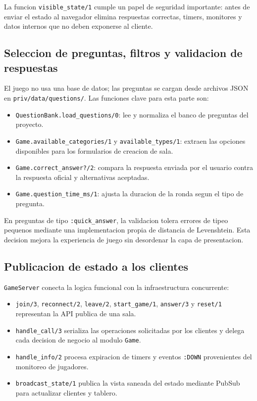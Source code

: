 \documentclass[12pt,a4paper]{article}
\begin{document}
La funcion \texttt{visible\_state/1} cumple un papel de seguridad importante:
antes de enviar el estado al navegador elimina respuestas correctas, timers,
monitores y datos internos que no deben exponerse al cliente.

\subsection{Seleccion de preguntas, filtros y validacion de respuestas}

El juego no usa una base de datos; las preguntas se cargan desde archivos JSON
en \texttt{priv/data/questions/}. Las funciones clave para esta parte son:

\begin{itemize}
  \item \texttt{QuestionBank.load\_questions/0}: lee y normaliza el banco de
  preguntas del proyecto.
  \item \texttt{Game.available\_categories/1} y \texttt{available\_types/1}:
  extraen las opciones disponibles para los formularios de creacion de sala.
  \item \texttt{Game.correct\_answer?/2}: compara la respuesta enviada por el
  usuario contra la respuesta oficial y alternativas aceptadas.
  \item \texttt{Game.question\_time\_ms/1}: ajusta la duracion de la ronda segun
  el tipo de pregunta.
\end{itemize}

En preguntas de tipo \texttt{:quick\_answer}, la validacion tolera errores de
tipeo pequenos mediante una implementacion propia de distancia de Levenshtein.
Esta decision mejora la experiencia de juego sin desordenar la capa de
presentacion.

\subsection{Publicacion de estado a los clientes}

\texttt{GameServer} conecta la logica funcional con la
infraestructura concurrente:

\begin{itemize}
  \item \texttt{join/3}, \texttt{reconnect/2}, \texttt{leave/2},
  \texttt{start\_game/1}, \texttt{answer/3} y \texttt{reset/1} representan la
  API publica de una sala.
  \item \texttt{handle\_call/3} serializa las operaciones solicitadas por los
  clientes y delega cada decision de negocio al modulo \texttt{Game}.
  \item \texttt{handle\_info/2} procesa expiracion de timers y eventos
  \texttt{:DOWN} provenientes del monitoreo de jugadores.
  \item \texttt{broadcast\_state/1} publica la vista saneada del estado mediante
  PubSub para actualizar clientes y tablero.
\end{itemize}
\end{document}
